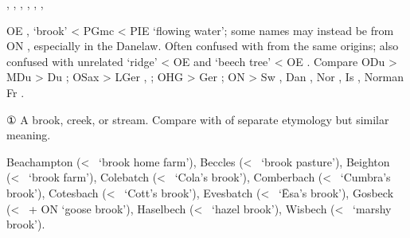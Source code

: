 \documentclass[12pt,letterpaper,oneside,article,draft]{memoir}
\begin{document}
\begin{Lemma}
\begin{Also}
	, , , , , , 
\end{Also}
\begin{Etymology}
	 OE ,  ‘brook’ < PGmc 
		< PIE  ‘flowing water’; some names may instead be from ON ,
		especially in the Danelaw.
	Often confused with  from the same origins; also confused with unrelated
		 ‘ridge’ < OE  and  ‘beech tree’ < OE .
	Compare
	ODu  > MDu  > Du ;
	OSax  > LGer , ;
	OHG  > Ger ;
	ON  > Sw , Dan , Nor , Is ,
		Norman Fr .
\end{Etymology}
\begin{Definitions}
	① A brook, creek, or stream. Compare with  of separate etymology but similar meaning.
\end{Definitions}
\begin{Examples}
	Beachampton (<~ ‘brook home farm’), Beccles (<~ ‘brook pasture’), Beighton (<~ ‘brook farm’), Colebatch (<~ ‘Cola’s brook’), Comberbach (<~ ‘Cumbra’s brook’), Cotesbach (<~ ‘Cott’s brook’), Evesbatch (<~ ‘Ēsa’s brook’), Gosbeck (<~ + ON  ‘goose brook’), Haselbech (<~ ‘hazel brook’), Wisbech (<~ ‘marshy brook’).
\end{Examples}
\end{Lemma}
\end{document}
